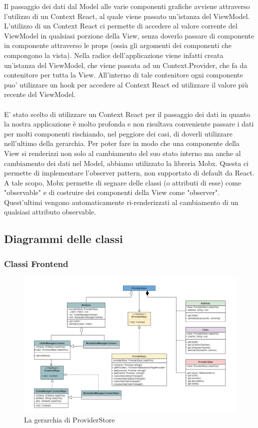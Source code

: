 Il passaggio dei dati dal Model alle varie componenti grafiche avviene attraverso l'utilizzo di un Context
React, al quale viene passato un'istanza del ViewModel. L'utilizzo di un Context React ci permette di
accedere al valore corrente del ViewModel in qualsiasi porzione della View, senza doverlo passare di
componente in componente attraverso le props (ossia gli argomenti dei componenti che compongono la
vista). Nella radice dell'applicazione viene infatti creata un'istanza del ViewModel, che viene passata
ad un Context.Provider, che fa da contenitore per tutta la View. All'interno di tale contenitore ogni
componente puo' utilizzare un hook per accedere al Context React ed utilizzare il valore più recente del ViewModel.
\\
\\
E' stato scelto di utilizzare un Context React per il passaggio dei dati in quanto la nostra applicazione è
molto profonda e non risultava conveniente passare i dati per molti componenti rischiando, nel peggiore
dei casi, di doverli utilizzare nell'ultimo della gerarchia.
Per poter fare in modo che una componente della View si renderizzi non solo al cambiamento del
suo stato interno ma anche al cambiamento dei dati nel Model, abbiamo utilizzato la libreria Mobx.
Questa ci permette di implementare l'observer pattern, non supportato di default da React. A tale
scopo, Mobx permette di segnare delle classi (o attributi di esse) come "observable" e di costruire
dei componenti della View come "observer". Quest'ultimi vengono automaticamente ri-renderizzati al
cambiamento di un qualsiasi attributo observable.

\subsection{Diagrammi delle classi}

\subsubsection{Classi Frontend}

\begin{figure}[H]
    \centering
    \includegraphics[scale = 0.5]{immagini/providerstore.png}
    \caption{La gerarchia di ProviderStore}
\end{figure}

